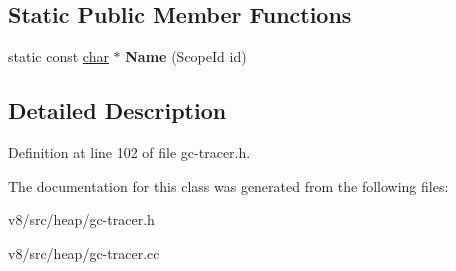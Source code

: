 \subsection*{Static Public Member Functions}
\begin{DoxyCompactItemize}
\item 
\mbox{\label{classv8_1_1internal_1_1GCTracer_1_1BackgroundScope_aaa7ae8d5952555fe860ca80f69d90ea2}} 
static const \mbox{\hyperlink{classchar}{char}} $\ast$ {\bfseries Name} (Scope\+Id id)
\end{DoxyCompactItemize}


\subsection{Detailed Description}


Definition at line 102 of file gc-\/tracer.\+h.



The documentation for this class was generated from the following files\+:\begin{DoxyCompactItemize}
\item 
v8/src/heap/gc-\/tracer.\+h\item 
v8/src/heap/gc-\/tracer.\+cc\end{DoxyCompactItemize}
